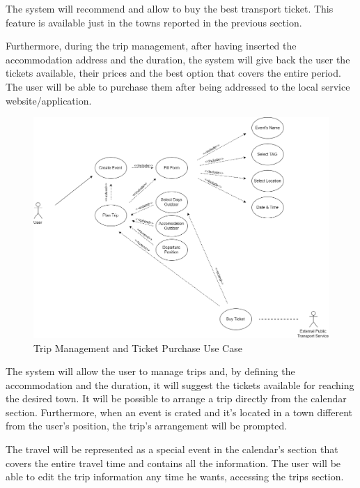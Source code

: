 The system will recommend and allow to buy the best transport ticket. This feature is available just in the towns reported in the previous section.\par
Furthermore, during the trip management, after having inserted the accommodation address and the duration, the system will give back the user the tickets available, their prices and the best option that covers the entire period. The user will be able to purchase them after being addressed to the local service website/application. 

\begin{figure}[H]
	\centering
	\includegraphics[scale=0.25]{Images/Use_Case/Trip}
	\caption{Trip Management and Ticket Purchase Use Case}
\end{figure}
The system will allow the user to manage trips and, by defining the accommodation and the duration, it will suggest the tickets available for reaching the desired town. It will be possible to arrange a trip directly from the calendar section. Furthermore, when an event is crated and it’s located in a town different from the user’s position, the trip’s arrangement will be prompted.\par
The travel will be represented as a special event in the calendar’s section that covers the entire travel time and contains all the information.
The user will be able to edit the trip information any time he wants, accessing the trips section.

